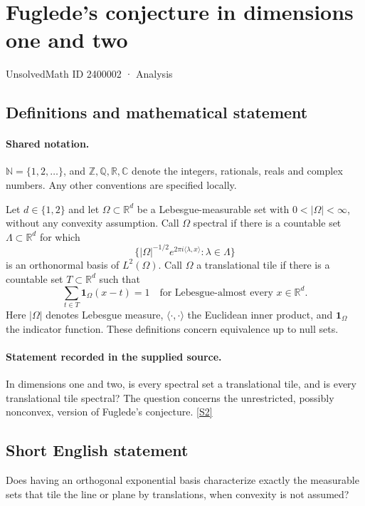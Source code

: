 \documentclass[11pt]{article}
\newcommand{\sref}[2]{\hyperlink{source:#1:#2}{[S#2]}}
\begin{document}
\setcounter{section}{2400001}
\section{Fuglede's conjecture in dimensions one and two}\label{2400002}
{\small\sffamily UnsolvedMath ID 2400002 · Analysis}
\subsection{Definitions and mathematical statement}

\paragraph{Shared notation.}$\mathbb N=\{1,2,\ldots\}$, and $\mathbb Z,\mathbb Q,\mathbb R,\mathbb C$ denote the integers, rationals, reals and complex numbers. Any other conventions are specified locally.


Let \(d\in\{1,2\}\) and let \(\Omega\subset\mathbb R^d\) be a Lebesgue-measurable set with \(0<|\Omega|<\infty\), without any convexity assumption. Call \(\Omega\) spectral if there is a countable set \(\Lambda\subset\mathbb R^d\) for which
\[
 \bigl\{|\Omega|^{-1/2}e^{2\pi i\langle\lambda,x\rangle}:\lambda\in\Lambda\bigr\}
\]
is an orthonormal basis of \(L^2(\Omega)\). Call \(\Omega\) a translational tile if there is a countable set \(T\subset\mathbb R^d\) such that
\[\sum_{t\in T}\mathbf1_\Omega(x-t)=1\quad\text{for Lebesgue-almost every }x\in\mathbb R^d.\]
Here \(|\Omega|\) denotes Lebesgue measure, \(\langle\cdot,\cdot\rangle\) the Euclidean inner product, and \(\mathbf1_\Omega\) the indicator function. These definitions concern equivalence up to null sets.
\paragraph{Statement recorded in the supplied source.}
In dimensions one and two, is every spectral set a translational tile, and is every translational tile spectral? The question concerns the unrestricted, possibly nonconvex, version of Fuglede's conjecture. \sref{2400002}{2}
\subsection{Short English statement}
Does having an orthogonal exponential basis characterize exactly the measurable sets that tile the line or plane by translations, when convexity is not assumed?
\end{document}
